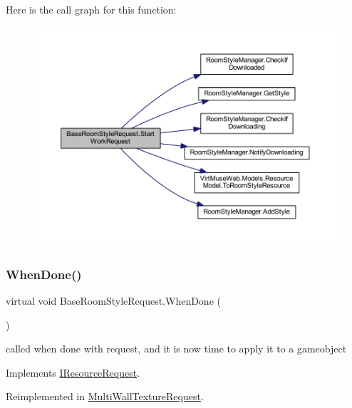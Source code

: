 Here is the call graph for this function\+:
\nopagebreak
\begin{figure}[H]
\begin{center}
\leavevmode
\includegraphics[width=350pt]{class_base_room_style_request_af2ac2de206ad154351cf6a1b1e7befd5_cgraph}
\end{center}
\end{figure}
\mbox{\label{class_base_room_style_request_ad87356fc17614818e1713857f8901a2a}} 
\subsubsection{\texorpdfstring{When\+Done()}{WhenDone()}}
{\footnotesize\ttfamily virtual void Base\+Room\+Style\+Request.\+When\+Done (\begin{DoxyParamCaption}{ }\end{DoxyParamCaption})\hspace{0.3cm}{\ttfamily [virtual]}}



called when done with request, and it is now time to apply it to a gameobject 



Implements \mbox{\hyperlink{interface_i_resource_request_a056e427fa6233602456ccb2d4c405aa0}{I\+Resource\+Request}}.



Reimplemented in \mbox{\hyperlink{class_multi_wall_texture_request_a96afd031b54eb8f09658fa1930b7d7f7}{Multi\+Wall\+Texture\+Request}}.

